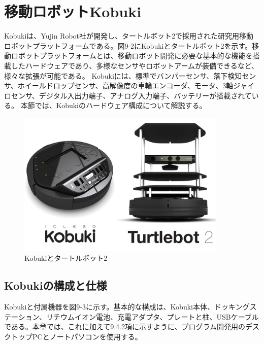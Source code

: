 \section{移動ロボットKobuki}

Kobukiは、Yujin Robot社が開発し、タートルボット2で採用された研究用移動ロボットプラットフォームである。図9-2にKobukiとタートルボット2を示す。移動ロボットプラットフォームとは、移動ロボット開発に必要な基本的な機能を搭載したハードウェアであり、多様なセンサやロボットアームが装備できるなど、様々な拡張が可能である。  Kobukiには、標準でバンパーセンサ、落下検知センサ、ホイールドロップセンサ、高解像度の車輪エンコーダ、モータ、3軸ジャイロセンサ、デジタル入出力端子、アナログ入力端子、バッテリーが搭載されている。  本節では、Kobukiのハードウェア構成について解説する。

\begin{figure}[htp]
  \centering
  \includegraphics[width=10cm]{pictures/chapter9/pic_09_02.png}
  \caption{Kobukiとタートルボット2}
\end{figure}


\subsection{Kobukiの構成と仕様}

Kobukiと付属機器を図9-3に示す。基本的な構成は、Kobuki本体、ドッキングステーション、リチウムイオン電池、充電アダプタ、プレートと柱、USBケーブルである。本章では、これに加えて9.4.2項に示すように、プログラム開発用のデスクトップPCとノートパソコンを使用する。

